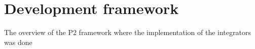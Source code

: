 \section{Development framework}
\label{section:framework}
The overview of the P2 framework where the implementation of the integrators was done